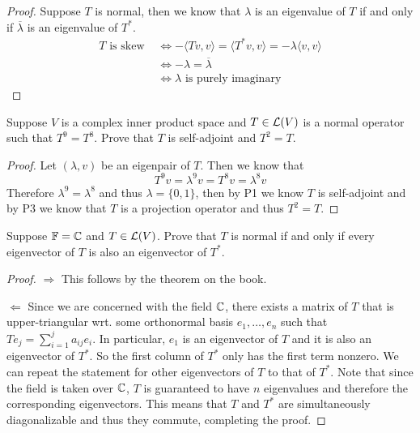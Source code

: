 \documentclass{extarticle}
\begin{document}
\begin{proof}
Suppose \(T\) is normal, then we know that \(\lambda\) is an eigenvalue of \(T\) if and only if 
\(\overline{\lambda}\) is an eigenvalue of \(T^*\).  
\begin{align*}
    T \text{ is skew } 
    &\Longleftrightarrow -\langle Tv,v \rangle = \langle T^*v,v \rangle = - \lambda \langle v,v \rangle \\ 
    &\Longleftrightarrow -\lambda = \overline{\lambda} \\ 
    &\Longleftrightarrow \lambda \text{ is purely imaginary} 
\end{align*}
\end{proof}

\begin{problem}{6}
    Suppose \(V\) is a complex inner product space and \(T \in \mathcal{L}(V)\) is a normal operator such 
    that \(T^9 = T^8\). Prove that \(T\) is self-adjoint and \(T^2 = T\).
\end{problem}

\begin{proof}
Let \((\lambda, v)\) be an eigenpair of \(T\). Then we know that 
\[T^9v = \lambda^9 v = T^8v = \lambda^8 v\]
Therefore \(\lambda^9 = \lambda^8\) and thus \(\lambda = \{0, 1\}\), then by P1 we know \(T\) 
is self-adjoint and by P3 we know that \(T\) is a projection operator and thus \(T^2 = T\).
\end{proof}

\begin{problem}{8}
    Suppose \(\mathbb{F} = \mathbb{C}\) and \(T \in \mathcal{L}(V)\). Prove that \(T\) is normal if and only if 
    every eigenvector of \(T\) is also an eigenvector of \(T^*\).
\end{problem}

\begin{proof}
\(\Rightarrow\) This follows by the theorem on the book. 

\(\Leftarrow\) Since we are concerned with the field \(\mathbb{C}\), there exists a matrix of \(T\) that 
is upper-triangular wrt. some orthonormal basis \(e_1, \ldots, e_n\) such that 
\(T e_j = \sum_{i=1}^{j} a_{ij} e_i\). In particular, \(e_1\) is an eigenvector of \(T\) and it is 
also an eigenvector of \(T^*\). So the first column of \(T^*\) only has the first term nonzero. We can 
repeat the statement for other eigenvectors of \(T\) to that of \(T^*\). Note that since the field 
is taken over \(\mathbb{C}\), \(T\) is guaranteed to have \(n\) eigenvalues and therefore the corresponding 
eigenvectors. This means that \(T\) and \(T^*\) are simultaneously diagonalizable and thus they 
commute, completing the proof.  
\end{proof}
\end{document}
